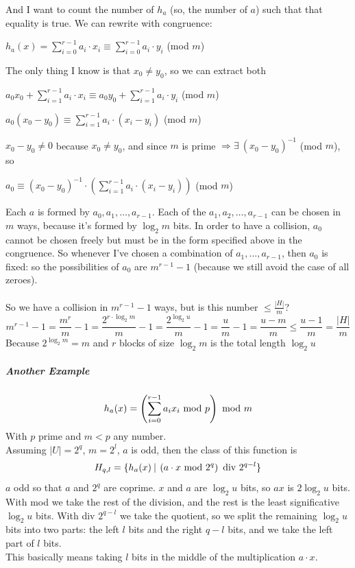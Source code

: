 \documentclass[10pt]{report}
\begin{document}
And I want to count the number of $h_a$ (so, the number of $a$) such that that equality is true. We can rewrite with congruence:\begin{list}{}{}
	\item $h_a(x) = \sum_{i=0}^{r-1} a_i\cdot x_i \equiv \sum_{i=0}^{r-1}a_i\cdot y_i$ (mod $m$)
\end{list}
The only thing I know is that $x_0\neq y_0$, so we can extract both\begin{list}{}{}
	\item $a_0x_0 + \sum_{i=1}^{r-1} a_i\cdot x_i \equiv a_0y_0 + \sum_{i=1}^{r-1}a_i\cdot y_i$ (mod $m$)
	\item $a_0(x_0-y_0) \equiv \sum_{i=1}^{r-1}a_i\cdot (x_i - y_i)$ (mod $m$)
\end{list}
$x_0-y_0\neq 0$ because $x_0\neq y_0$, and since $m$ is prime $\Rightarrow\exists\:(x_0-y_0)^{-1}$ (mod $m$), so\begin{list}{}{}
	\item $a_0 \equiv (x_0-y_0)^{-1}\cdot\left(\sum_{i=1}^{r-1}a_i\cdot (x_i-y_i)\right)$ (mod $m$)
\end{list}
Each $a$ is formed by $a_0,a_1,\ldots,a_{r-1}$. Each of the $a_1,a_2,\ldots,a_{r-1}$ can be chosen in $m$ ways, because it's formed by $\log_2 m$ bits. In order to have a collision, $a_0$ cannot be chosen freely but must be in the form specified above in the congruence. So whenever I've chosen a combination of $a_1,\ldots,a_{r-1}$, then $a_0$ is fixed: so the possibilities of $a_0$ are $m^{r-1} - 1$ (because we still avoid the case of all zeroes).\\\\
So we have a collision in $m^{r-1}-1$ ways, but is this number $\leq \frac{|H|}{m}$?
$$m^{r-1}-1 = \frac{m^r}{m} -1 = \frac{2^{r\cdot\log_2 m}}{m} - 1 = \frac{2^{\log_2 u}}{m} - 1 = \frac{u}{m} - 1 = \frac{u-m}{m} \leq \frac{u-1}{m} = \frac{|H|}{m}$$
Because $2^{\log_2 m} = m$ and $r$ blocks of size $\log_2 m$ is the total length $\log_2 u$
\subparagraph{Another Example} $$h_a(x) = \left(\sum_{i=0}^{r-1}a_ix_i\hbox{ mod }p\right)\hbox{ mod } m$$
With $p$ prime and $m < p$ any number.\\
Assuming $|U| = 2^q$, $m = 2^l$, $a$ is odd, then the class of this function is $$H_{q,l} = \{h_a(x)\:|\:\left(a\cdot x\hbox { mod }2^q\right)\hbox{ div }2^{q-l}\}$$
$a$ odd so that $a$ and $2^q$ are coprime. $x$ and $a$ are $\log_2 u$ bits, so $ax$ is $2\log_2 u$ bits. With mod we take the rest of the division, and the rest is the least significative $\log_2 u$ bits. With div $2^{q-l}$ we take the quotient, so we split the remaining $\log_2 u$ bits into two parts: the left $l$ bits and the right $q-l$ bits, and we take the left part of $l$ bits.\\
This basically means taking $l$ bits in the middle of the multiplication $a\cdot x$.
\end{document}
